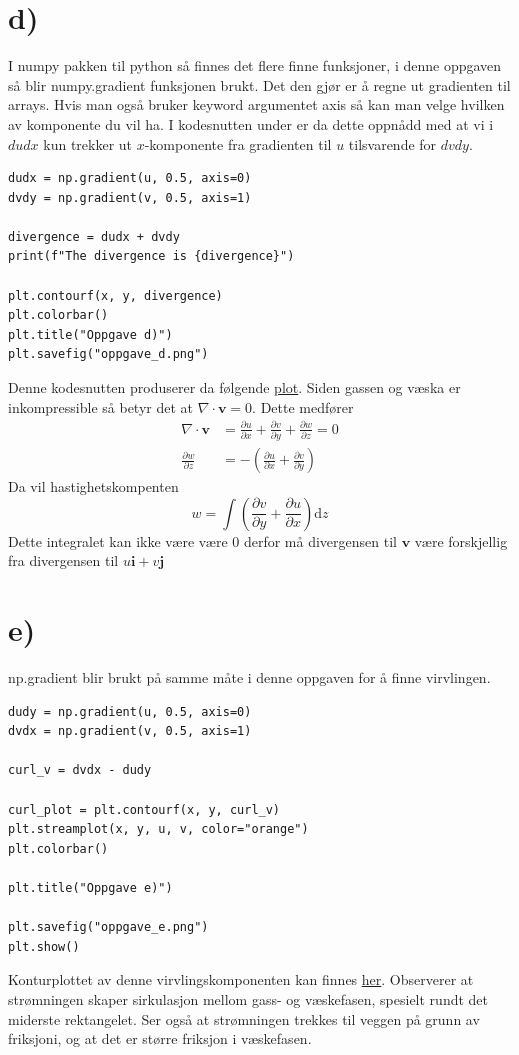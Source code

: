 \documentclass[a4paper,10pt,norsk]{article}
\newcommand{\dd}[1]{\mathrm{d}#1}
\begin{document}
	\section*{d)}\label{ass:d}
	I numpy pakken til python så finnes det flere finne funksjoner, i denne oppgaven så blir numpy.gradient funksjonen brukt. 
	Det den gjør er å regne ut gradienten til arrays. 
	Hvis man også bruker keyword argumentet axis så kan man velge hvilken av komponente du vil ha. 
	I kodesnutten under er da dette oppnådd med at vi i $dudx$ kun trekker ut $x$-komponente fra gradienten til $u$ tilsvarende for  $dvdy$.
	\begin{lstlisting}[caption=Oppgave d]
dudx = np.gradient(u, 0.5, axis=0)
dvdy = np.gradient(v, 0.5, axis=1)

divergence = dudx + dvdy
print(f"The divergence is {divergence}")

plt.contourf(x, y, divergence)
plt.colorbar()
plt.title("Oppgave d)")
plt.savefig("oppgave_d.png")
	\end{lstlisting}
	Denne kodesnutten produserer da følgende \hyperref[fig:d]{plot}.
	Siden gassen og væska er inkompressible så betyr det at $\nabla \cdot \mathbf{v} = 0$.
	Dette medfører
	\begin{align*}
		\nabla \cdot \mathbf{v} &= \frac{\partial u}{\partial x} + \frac{\partial v}{\partial y} + \frac{\partial w}{\partial z} = 0\\
		\frac{\partial w}{\partial z} &= - \left( \frac{\partial u}{\partial x} + \frac{\partial v}{\partial y} \right) 
	\end{align*}
	Da vil hastighetskompenten \[
	w = \int \left( \frac{\partial v}{\partial y} + \frac{\partial u}{\partial x} \right) \dd{z}

	\] 
	Dette integralet kan ikke være være $0$ derfor må divergensen til $\mathbf{v}$ være forskjellig fra divergensen til $u \mathbf{i} + v \mathbf{j}$ 
	\section*{e)}\label{ass:e}
	np.gradient blir brukt på samme måte i denne oppgaven for å finne virvlingen.
	\begin{lstlisting}
dudy = np.gradient(u, 0.5, axis=0)
dvdx = np.gradient(v, 0.5, axis=1)

curl_v = dvdx - dudy

curl_plot = plt.contourf(x, y, curl_v)
plt.streamplot(x, y, u, v, color="orange")
plt.colorbar()

plt.title("Oppgave e)")

plt.savefig("oppgave_e.png")
plt.show()
	\end{lstlisting}
	Konturplottet av denne virvlingskomponenten kan finnes \hyperref[fig:e]{her}. 
	Observerer at strømningen skaper sirkulasjon mellom gass- og væskefasen, spesielt rundt det miderste rektangelet. 
	Ser også at strømningen trekkes til veggen på grunn av friksjoni, og at det er større friksjon i væskefasen. 
\end{document}
